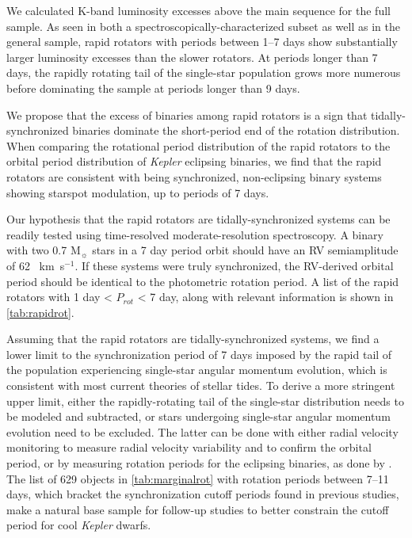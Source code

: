 \documentclass[manuscript]{aastex6}
\newcommand{\Kepler}{\mbox{\textit{Kepler}}}
\newcommand{\kms}{\textrm{~km~s}\ensuremath{^{-1}}}
\begin{document}
We calculated K-band luminosity excesses above the main sequence for the full
\citet{McQuillan14} sample. As seen in both a spectroscopically-characterized
subset as well as in the general sample, rapid rotators with periods between
1--7 days show substantially larger luminosity excesses than the slower
rotators. At periods longer than 7 days, the rapidly rotating tail of the
single-star population grows more numerous before dominating the sample at
periods longer than 9 days. 

We propose that the excess of binaries among rapid rotators is a sign that
tidally-synchronized binaries dominate the short-period end of the rotation
distribution. When comparing the rotational period distribution of the rapid 
rotators to the orbital period distribution of \Kepler{} eclipsing binaries, we
find that the rapid rotators are consistent with being synchronized, 
non-eclipsing binary systems showing starspot modulation, up to periods of 7
days.

Our hypothesis that the rapid rotators are tidally-synchronized systems can be
readily tested using time-resolved moderate-resolution spectroscopy. A binary
with two 0.7 M\(_\sun\) stars in a 7 day period orbit should have an RV
semiamplitude of 62 \kms. If these systems were truly synchronized, the
RV-derived orbital period should be identical to the photometric rotation
period. A list of the rapid rotators with 1 day < \(P_{rot}\) < 7 day, along
with relevant information is shown in \cref{tab:rapidrot}.

Assuming that the rapid rotators are tidally-synchronized systems, we find a
lower limit to the synchronization period of 7 days imposed by the rapid tail
of the population experiencing single-star angular momentum evolution, which is
consistent with most current theories of stellar tides. To derive a more
stringent upper limit, either the rapidly-rotating tail of the single-star
distribution needs to be modeled and subtracted, or stars undergoing 
single-star angular momentum evolution need to be excluded. The latter can be
done with either radial velocity monitoring to measure radial velocity
variability and to confirm the orbital period, or by measuring rotation periods
for the eclipsing binaries, as done by \citet{Lurie17}. The list of 629
objects in \cref{tab:marginalrot} with rotation periods between 7--11 days, 
which bracket the synchronization cutoff periods found in previous studies,
make a natural base sample for follow-up studies to better constrain the 
cutoff period for cool \Kepler{} dwarfs.
\end{document}
